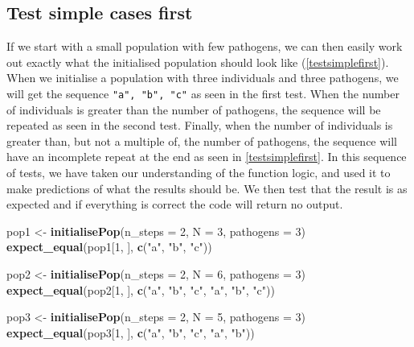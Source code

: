 \documentclass[]{elsarticle} %
\newenvironment{Shaded}{\begin{snugshade}}{\end{snugshade}}
\newcommand{\DataTypeTok}[1]{\textcolor[rgb]{0.13,0.29,0.53}{#1}}
\newcommand{\DecValTok}[1]{\textcolor[rgb]{0.00,0.00,0.81}{#1}}
\newcommand{\KeywordTok}[1]{\textcolor[rgb]{0.13,0.29,0.53}{\textbf{#1}}}
\newcommand{\NormalTok}[1]{#1}
\newcommand{\StringTok}[1]{\textcolor[rgb]{0.31,0.60,0.02}{#1}}
\begin{document}
\hypertarget{easycases}{%
\subsection*{Test simple cases first}\label{easycases}}

If we start with a small population with few pathogens, we can then easily work out exactly what the initialised population should look like (\ref{testsimplefirst}).
When we initialise a population with three individuals and three pathogens, we will get the sequence \texttt{"a", "b", "c"} as seen in the first test.
When the number of individuals is greater than the number of pathogens, the sequence will be repeated as seen in the second test.
Finally, when the number of individuals is greater than, but not a multiple of, the number of pathogens, the sequence will have an incomplete repeat at the end as seen in \ref{testsimplefirst}.
In this sequence of tests, we have taken our understanding of the function logic, and used it to make predictions of what the results should be.
We then test that the result is as expected and if everything is correct the code will return no output.
\newline
{}\label{testsimplefirst}

\begin{Shaded}
\begin{Highlighting}[]
\NormalTok{pop1 <-}\StringTok{ }\KeywordTok{initialisePop}\NormalTok{(}\DataTypeTok{n_steps =} \DecValTok{2}\NormalTok{, }\DataTypeTok{N =} \DecValTok{3}\NormalTok{, }\DataTypeTok{pathogens =} \DecValTok{3}\NormalTok{) }
\KeywordTok{expect_equal}\NormalTok{(pop1[}\DecValTok{1}\NormalTok{, ], }\KeywordTok{c}\NormalTok{(}\StringTok{"a"}\NormalTok{, }\StringTok{"b"}\NormalTok{, }\StringTok{"c"}\NormalTok{))}

\NormalTok{pop2 <-}\StringTok{ }\KeywordTok{initialisePop}\NormalTok{(}\DataTypeTok{n_steps =} \DecValTok{2}\NormalTok{, }\DataTypeTok{N =} \DecValTok{6}\NormalTok{, }\DataTypeTok{pathogens =} \DecValTok{3}\NormalTok{) }
\KeywordTok{expect_equal}\NormalTok{(pop2[}\DecValTok{1}\NormalTok{, ], }\KeywordTok{c}\NormalTok{(}\StringTok{"a"}\NormalTok{, }\StringTok{"b"}\NormalTok{, }\StringTok{"c"}\NormalTok{, }\StringTok{"a"}\NormalTok{, }\StringTok{"b"}\NormalTok{, }\StringTok{"c"}\NormalTok{))}

\NormalTok{pop3 <-}\StringTok{ }\KeywordTok{initialisePop}\NormalTok{(}\DataTypeTok{n_steps =} \DecValTok{2}\NormalTok{, }\DataTypeTok{N =} \DecValTok{5}\NormalTok{, }\DataTypeTok{pathogens =} \DecValTok{3}\NormalTok{) }
\KeywordTok{expect_equal}\NormalTok{(pop3[}\DecValTok{1}\NormalTok{, ], }\KeywordTok{c}\NormalTok{(}\StringTok{"a"}\NormalTok{, }\StringTok{"b"}\NormalTok{, }\StringTok{"c"}\NormalTok{, }\StringTok{"a"}\NormalTok{, }\StringTok{"b"}\NormalTok{))}
\end{Highlighting}
\end{Shaded}
\end{document}
